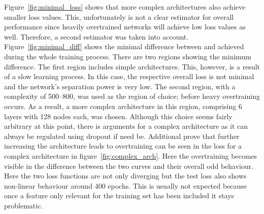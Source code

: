 Figure~\ref{fig:minimal_loss} shows that more complex architectures also achieve smaller loss values.
This, unfortunately is not a clear estimator for overall performance since heavily overtrained networks will achieve low loss values as well.
Therefore, a second estimator was taken into account. Figure~\ref{fig:minimal_diff} shows the minimal difference between \losstrain and \losstest achieved during the whole training process.
There are two regions showing the minimum difference. The first region includes simple architectures.
This, however, is a result of a slow learning process. In this case, the respective overall loss is not minimal and the network's separation power is very low.
The second region, with a complexity of \numrange{500}{800}, was used as the region of choice; before heavy overtraining occurs.
As a result, a more complex architecture in this region, comprising \num{6} layers with \num{128} nodes each, was chosen.
Although this choice seems fairly arbitrary at this point, there is arguments for a complex architecture as it can always be regulated using dropout if need be. Additional prove that further increasing the architecture leads to overtraining can be seen in the loss for a complex architecture in figure~\ref{fig:complex_arch}. Here the overtraining becomes visible in the difference between the two curves and their overall odd behaviour. Here the two loss functions are not only diverging but the test loss also shows non-linear behaviour around \num{400} epochs. This is usually not expected because once a feature only relevant for the training set has been included it stays problematic.



